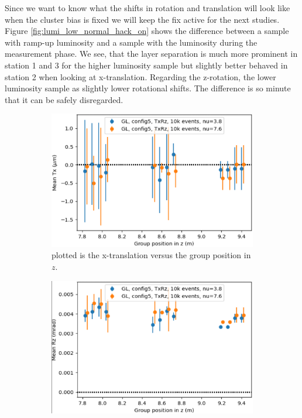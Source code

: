 Since we want to know what the shifts in rotation and translation will look like when the cluster bias is fixed we will keep the fix active for the next studies.
Figure \ref{fig:lumi_low_normal_hack_on} shows the difference between a sample with ramp-up luminosity and a sample with the luminosity during the measurement phase.
We see, that the layer separation is much more prominent in station 1 and 3 for the higher luminosity sample but slightly better behaved in station 2 when looking at x-translation.
Regarding the z-rotation, the lower luminosity sample as slightly lower rotational shifts.
The difference is so minute that it can be safely disregarded.

\begin{figure}
  \centering
  \begin{subfigure}[b]{0.48\textwidth}
    \centering
    \includegraphics[width=\textwidth]{plots/jan_24_2022/tx_low_normal.png}
    \caption{plotted is the x-translation versus the group position in $z$.}
    \label{fig:compare_tx}
  \end{subfigure}
  \hfill
  \begin{subfigure}[b]{0.48\textwidth}
    \centering
    \includegraphics[width=\textwidth]{plots/jan_24_2022/rz_low_normal.png}

\end{subfigure}
\end{figure}
